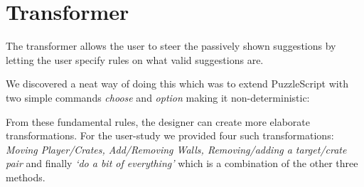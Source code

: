 \section{Transformer}
The transformer allows the user to steer the passively shown suggestions by letting the user specify rules on what valid suggestions are.

We discovered a neat way of doing this which was to extend PuzzleScript with two simple commands \textit{choose} and \textit{option} making it non-deterministic: \\
\hspace{\dimexpr-\fboxrule-\fboxsep\relax}

From these fundamental rules, the designer can create more elaborate transformations. For the user-study we provided four such transformations: \textit{Moving Player/Crates, Add/Removing Walls, Removing/adding a target/crate pair} and finally \textit{`do a bit of everything'} which is a combination of the other three methods.

